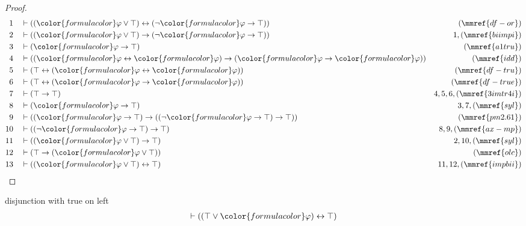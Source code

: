 \begin{proof}
\begin{align}
  1 && & \vdash ( ( {\color{formulacolor}\varphi} \vee \top ) \leftrightarrow (
      \lnot {\color{formulacolor}\varphi} \rightarrow \top
      ) )&(\mmref{df-or})\notag
  \\ 2 && & \vdash ( ( {\color{formulacolor}\varphi} \vee \top ) \rightarrow (
      \lnot {\color{formulacolor}\varphi} \rightarrow \top
      ) )&1,(\mmref{biimpi})\notag
  \\ 3 && & \vdash ( {\color{formulacolor}\varphi} \rightarrow \top
      )&(\mmref{a1tru})\notag
  \\ 4 && & \vdash ( ( {\color{formulacolor}\varphi} \leftrightarrow
      {\color{formulacolor}\varphi} ) \rightarrow (
      {\color{formulacolor}\varphi} \rightarrow
      {\color{formulacolor}\varphi} )
      )&(\mmref{idd})\notag
  \\ 5 && & \vdash ( \top \leftrightarrow ( {\color{formulacolor}\varphi}
      \leftrightarrow {\color{formulacolor}\varphi} )
      )&(\mmref{df-tru})\notag
  \\ 6 && & \vdash ( \top \leftrightarrow ( {\color{formulacolor}\varphi}
      \rightarrow {\color{formulacolor}\varphi} )
      )&(\mmref{df-true})\notag
  \\ 7 && & \vdash ( \top \rightarrow \top )&4,5,6,(\mmref{3imtr4i})\notag
  \\ 8 && & \vdash ( {\color{formulacolor}\varphi} \rightarrow \top
      )&3,7,(\mmref{syl})\notag
  \\ 9 && & \vdash ( ( {\color{formulacolor}\varphi} \rightarrow \top )
      \rightarrow ( ( \lnot {\color{formulacolor}\varphi}
      \rightarrow \top ) \rightarrow \top )
      )&(\mmref{pm2.61})\notag
  \\ 10 && & \vdash ( ( \lnot {\color{formulacolor}\varphi} \rightarrow \top )
      \rightarrow \top )&8,9,(\mmref{ax-mp})\notag
  \\ 11 && & \vdash ( ( {\color{formulacolor}\varphi} \vee \top ) \rightarrow
      \top )&2,10,(\mmref{syl})\notag
  \\ 12 && & \vdash ( \top \rightarrow ( {\color{formulacolor}\varphi} \vee
      \top ) )&(\mmref{olc})\notag
  \\ 13 && & \vdash ( ( {\color{formulacolor}\varphi} \vee \top )
      \leftrightarrow \top )&11,12,(\mmref{impbii})\notag
\end{align}
\end{proof}

\begin{lemma} disjunction with true  on left
\begin{align}
\vdash ( ( \top \vee {\color{formulacolor}\varphi} ) \leftrightarrow \top
    )\label{bl.ortrl}
\end{align}
\end{lemma}

